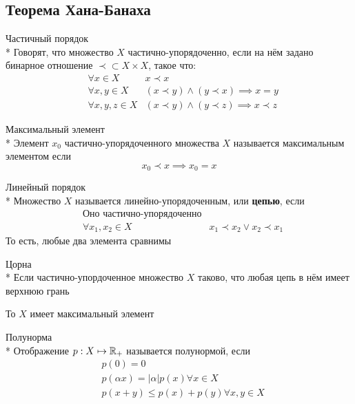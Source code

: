 \subsection{Теорема Хана-Банаха}

\begin{dfn}{Частичный порядок}\\*
  Говорят, что множество $X$
  частично-упорядоченно,
  если на нём задано бинарное отношение
  $\prec\subset X\times X$, такое что:
  \begin{align*}
    & \forall x\in X & x\prec x \\
    & \forall x,y\in X & (x\prec y)\land (y\prec x) \implies x=y\\
    & \forall x,y,z\in X & (x\prec y)\land (y\prec z) \implies x\prec z
  \end{align*}
\end{dfn}

\begin{dfn}{Максимальный элемент}\\*
  Элемент $x_0$ частично-упорядоченного множества $X$
  называется максимальным элементом если
  $$x_0\prec x \implies x_0=x$$
\end{dfn}

\begin{dfn}{Линейный порядок}\\*
  Множество $X$ называется линейно-упорядоченным,
  или \textbf{цепью}, если
  \begin{align*}
    & \text{Оно частично-упорядоченно} \\
    & \forall x_1,x_2\in X & x_1\prec x_2 \lor x_2\prec x_1
  \end{align*}
  То есть, любые два элемента сравнимы
\end{dfn}

\begin{lemma}{Цорна}\\*
  Если частично-упордоченное множество $X$
  таково, что любая цепь в нём имеет верхнюю грань

  То $X$ имеет максимальный элемент
\end{lemma}

\begin{dfn}{Полунорма}\\*
  Отображение $p : X\mapsto\mathbb{R}_+$ называется полунормой, если
  \begin{align*}
    & p(0) = 0 \\
    & p(\alpha x) = \left|\alpha\right| p(x) \forall x\in X\\
    & p(x+y) \leq p(x) + p(y) \forall x,y\in X
  \end{align*}
\end{dfn}

